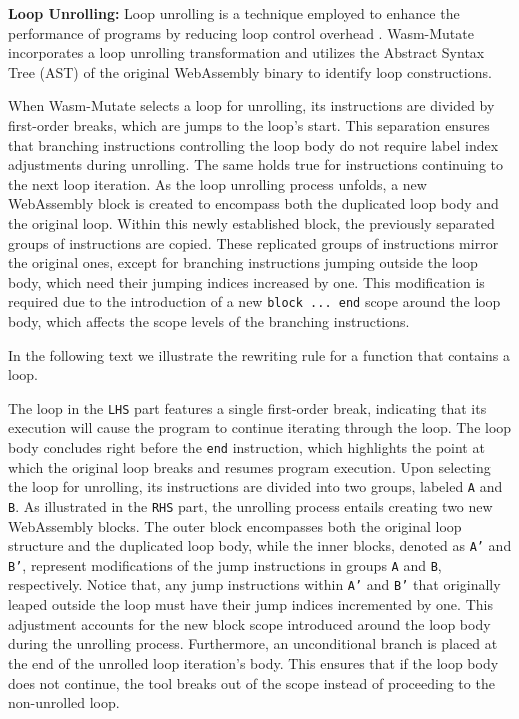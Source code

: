 \documentclass[a4paper,fleqn]{cas-dc}
\newcommand{\tool}{{\sc Wasm-Mutate}\xspace}
\begin{document}
\textbf{Loop Unrolling:} 
Loop unrolling is a technique employed to enhance the performance of programs by reducing loop control overhead \cite{dongarra1979unrolling}. 
\tool incorporates a loop unrolling transformation and utilizes the Abstract Syntax Tree (AST) of the original WebAssembly binary to identify loop constructions. 

When \tool selects a loop for unrolling, its instructions are divided by first-order breaks, which are jumps to the loop's start. This separation ensures that branching instructions controlling the loop body do not require label index adjustments during unrolling. The same holds true for instructions continuing to the next loop iteration.
As the loop unrolling process unfolds, a new WebAssembly block is created to encompass both the duplicated loop body and the original loop. 
Within this newly established block, the previously separated groups of instructions are copied. 
These replicated groups of instructions mirror the original ones, except for branching instructions jumping outside the loop body, which need their jumping indices increased by one. This modification is required due to the introduction of a new \texttt{block ... end} scope around the loop body, which affects the scope levels of the branching instructions.

In the following text we illustrate the rewriting rule for a function that contains a loop. 


The loop in the \texttt{LHS} part features a single first-order break, indicating that its execution will cause the program to continue iterating through the loop. 
The loop body concludes right before the \texttt{end} instruction, which highlights the point at which the original loop breaks and resumes program execution.
Upon selecting the loop for unrolling, its instructions are divided into two groups, labeled \texttt{A} and \texttt{B}. 
As illustrated in the \texttt{RHS} part, the unrolling process entails creating two new WebAssembly blocks. 
The outer block encompasses both the original loop structure and the duplicated loop body, while the inner blocks, denoted as \texttt{A'} and \texttt{B'}, represent modifications of the jump instructions in groups \texttt{A} and \texttt{B}, respectively.
Notice that, any jump instructions within \texttt{A'} and \texttt{B'} that originally leaped outside the loop must have their jump indices incremented by one. 
This adjustment accounts for the new block scope introduced around the loop body during the unrolling process. 
Furthermore, an unconditional branch is placed at the end of the unrolled loop iteration's body. 
This ensures that if the loop body does not continue, the tool breaks out of the scope instead of proceeding to the non-unrolled loop.
\end{document}
